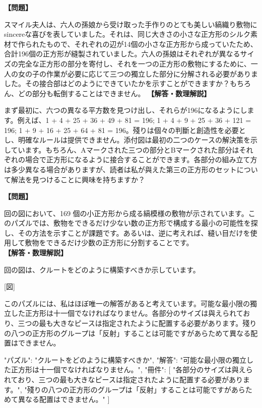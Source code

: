 \documentclass[10pt,a4paper,oneside,openany]{ltjsbook}
\begin{document}
\begin{tcolorbox}[colback=softblue,colframe=primaryblue,title=\textbf{第 172 問：ミス・スマイルイのクリスマスプレゼント （原題: MRS. SMILEY'S CHRISTMAS PRESENT.）},arc=2mm,boxrule=1pt,breakable]
\textbf{【問題】}\par\vspace{0.3em}
スマイル夫人は、六人の孫娘から受け取った手作りのとても美しい縞織り敷物に sincereな喜びを表していました。それは、同じ大きさの小さな正方形のシルク素材で作られたもので、それぞれの辺が14個の小さな正方形から成っていたため、合計196個の正方形が縫製されていました。六人の孫娘はそれぞれが異なるサイズの完全な正方形の部分を寄付し、それを一つの正方形の敷物にするために、一人の女の子の作業が必要に応じて三つの獨立した部分に分解される必要がありました。その接合部はどのようにできていたかを示すことができますか？もちろん、どの部分も転倒することはできません。
\tcblower
\textbf{【解答・数理解説】}\par\vspace{0.3em}
まず最初に、六つの異なる平方数を見つけ出し、それらが196になるようにします。例えば、1 + 4 + 25 + 36 + 49 + 81 = 196; 1 + 4 + 9 + 25 + 36 + 121 = 196; 1 + 9 + 16 + 25 + 64 + 81 = 196。殘りは個々の判斷と創造性を必要とし、明確なルールは提供できません。添付図は最初の二つのケースの解決策を示しています。もちろん、Aマークされた三つの部分とBマークされた部分はそれぞれの場合で正方形になるように接合することができます。各部分の組み立て方は多少異なる場合がありますが、読者は私が與えた第三の正方形のセットについて解法を見つけることに興味を持ちますか？
\end{tcolorbox}

\begin{tcolorbox}[colback=softblue,colframe=primaryblue,title=\textbf{第 173 問：MRS. PERKINS'S QUILT.},arc=2mm,boxrule=1pt,breakable]
\textbf{【問題】}\par\vspace{0.3em}
回の図において、169 個の小正方形から成る縞模様の敷物が示されています。このパズルでは、敷物をできるだけ少ない数の正方形で構成する最小の可能性を探し、その方法を示すことが課題です。あるいは、逆に考えれば、縫い目だけを使用して敷物をできるだけ少数の正方形に分割することです。
\tcblower
\textbf{【解答・数理解説】}\par\vspace{0.3em}
回の図は、クルートをどのように構築すべきか示しています。

[図]

このパズルには、私はほぼ唯一の解答があると考えています。可能な最小限の獨立した正方形は十一個でなければなりません。各部分のサイズは與えられており、三つの最も大きなピースは指定されたように配置する必要があります。殘りの八つの正方形のグループは「反射」することは可能ですがあらためて異なる配置はできません。

{
  "パズル": "クルートをどのように構築すべきか",
  "解答": "可能な最小限の獨立した正方形は十一個でなければなりません。",
  "冊件": [
    "各部分のサイズは與えられており、三つの最も大きなピースは指定されたように配置する必要があります。",
    "殘りの八つの正方形のグループは「反射」することは可能ですがあらためて異なる配置はできません。"
  ]
}
\end{tcolorbox}
\end{document}
